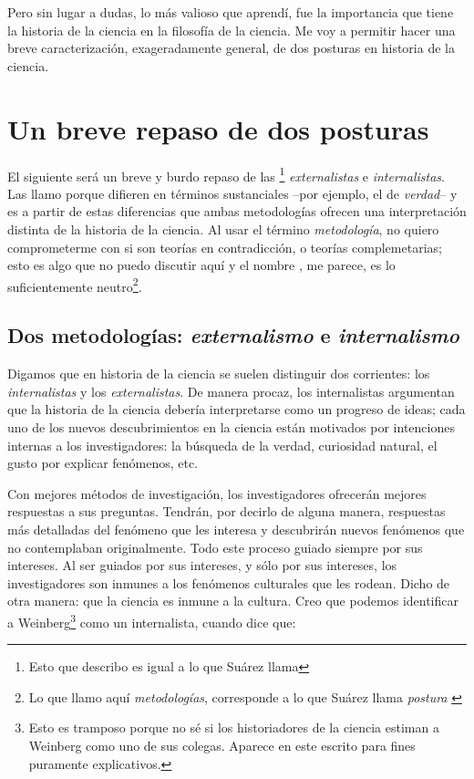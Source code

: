 Pero sin lugar a dudas, lo más valioso que aprendí, fue la importancia que tiene la historia de la ciencia en la filosofía de la ciencia.
Me voy a permitir hacer una breve caracterización, exageradamente general, de dos posturas en historia de la ciencia.


\section{Un breve repaso de dos posturas}

\noindent El siguiente será un breve y burdo repaso de las \footnote{Esto que describo es igual a lo que Suárez llama } \emph{externalistas} e \emph{internalistas}.
Las llamo  porque difieren en términos sustanciales --por ejemplo, el de \emph{verdad}-- y es a partir de estas diferencias que ambas metodologías ofrecen una interpretación distinta de la historia de la ciencia.
Al usar el término \emph{metodología}, no quiero comprometerme con si son teorías en contradicción, o teorías complemetarias; esto es algo que no puedo discutir aquí y el nombre , me parece, es lo suficientemente neutro\footnote{
Lo que llamo aquí \emph{metodologías}, corresponde a lo que Suárez llama \emph{postura} \cite{suárez emergence}
}.


\subsection{Dos metodologías: \emph{externalismo} e \emph{internalismo}}

\noindent Digamos que en historia de la ciencia se suelen distinguir dos corrientes: los \emph{internalistas} y los \emph{externalistas}.
De manera procaz, los internalistas argumentan que la historia de la ciencia debería interpretarse como un progreso de ideas; cada uno de los nuevos descubrimientos en la ciencia están motivados por intenciones internas a los investigadores: la búsqueda de la verdad, curiosidad natural, el gusto por explicar fenómenos, etc.

Con mejores métodos de investigación, los investigadores ofrecerán mejores respuestas a sus preguntas.
Tendrán, por decirlo de alguna manera, respuestas más detalladas del fenómeno que les interesa y descubrirán nuevos fenómenos que no contemplaban originalmente.
Todo este proceso guiado siempre por sus intereses.
Al ser guiados por sus intereses, y sólo por sus intereses, los investigadores son inmunes a los fenómenos culturales que les rodean.
Dicho de otra manera: que la ciencia es inmune a la cultura.
Creo que podemos identificar a Weinberg\footnote{
	Esto es tramposo porque no sé si los historiadores de la ciencia estiman a Weinberg como uno de sus colegas.
	Aparece en este escrito para fines puramente explicativos.
	} 
como un internalista, cuando dice que:

